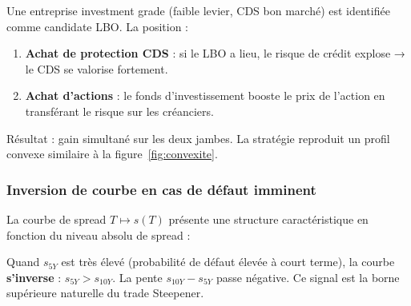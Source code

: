 \begin{exemple}
Une entreprise investment grade (faible levier, CDS bon marché) est identifiée comme candidate LBO. La position :
\begin{enumerate}
    \item \textbf{Achat de protection CDS} : si le LBO a lieu, le risque de crédit explose → le CDS se valorise fortement.
    \item \textbf{Achat d'actions} : le fonds d'investissement booste le prix de l'action en transférant le risque sur les créanciers.
\end{enumerate}
Résultat : gain simultané sur les deux jambes. La stratégie reproduit un profil convexe similaire à la figure~\ref{fig:convexite}.
\end{exemple}

\subsubsection{Inversion de courbe en cas de défaut imminent}

La courbe de spread $T \mapsto s(T)$ présente une structure caractéristique en fonction du niveau absolu de spread :

\begin{center}
\end{center}

Quand $s_{5Y}$ est très élevé (probabilité de défaut élevée à court terme), la courbe \textbf{s'inverse} : $s_{5Y} > s_{10Y}$. La pente $s_{10Y} - s_{5Y}$ passe négative. Ce signal est la borne supérieure naturelle du trade Steepener.

